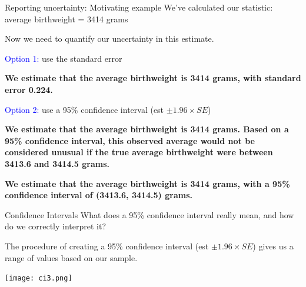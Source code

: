 \documentclass[10pt,t]{beamer}
\begin{document}
\begin{frame}{Reporting uncertainty: Motivating example}
We've calculated our statistic: average birthweight = 3414 grams

\vspace{0.3cm}

Now we need to quantify our uncertainty in this estimate.

\vspace{0.3cm}

\textcolor{blue}{Option 1:} use the standard error
\smallskip

\textbf{We estimate that the average birthweight is 3414 grams, with standard error 0.224.}

\vspace{0.3cm}

\textcolor{blue}{Option 2:} use a 95\% confidence interval (est $\pm 1.96 \times SE$)
\smallskip

\textbf{We estimate that the average birthweight is 3414 grams. Based on a 95\% confidence interval, this observed average would not be considered unusual if the true average birthweight were between 3413.6 and  3414.5 grams.}
\medskip

\textbf{We estimate that the average birthweight is 3414 grams, with a 95\% confidence interval of (3413.6, 3414.5) grams.}

\end{frame}

%
%
%
%
%
%
%
%
%

\begin{frame}{Confidence Intervals}
What does a 95\% confidence interval really mean, and how do we correctly interpret it?

\vspace{0.3cm}

The procedure of creating a 95\% confidence interval (est $\pm 1.96 \times SE$) gives us a range of values based on our sample.

\centering \texttt{[image: ci3.png]}

\end{frame}
\end{document}
